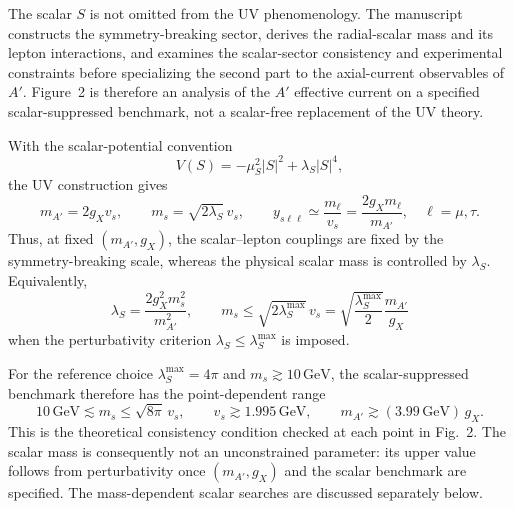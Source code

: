 \documentclass[12pt,a4paper]{article}
\begin{document}
The scalar \(S\) is not omitted from the UV phenomenology. The manuscript constructs the symmetry-breaking sector, derives the radial-scalar mass and its lepton interactions, and examines the scalar-sector consistency and experimental constraints before specializing the second part to the axial-current observables of \(A'\). Figure~2 is therefore an analysis of the \(A'\) effective current on a specified scalar-suppressed benchmark, not a scalar-free replacement of the UV theory.

With the scalar-potential convention
\[
V(S)=-\mu_S^2|S|^2+\lambda_S|S|^4,
\]
the UV construction gives
\[
m_{A'}=2g_Xv_s,\qquad
m_s=\sqrt{2\lambda_S}\,v_s,\qquad
y_{s\ell\ell}\simeq\frac{m_\ell}{v_s}
=\frac{2g_Xm_\ell}{m_{A'}},
\quad \ell=\mu,\tau.
\]
Thus, at fixed \((m_{A'},g_X)\), the scalar--lepton couplings are fixed by the symmetry-breaking scale, whereas the physical scalar mass is controlled by \(\lambda_S\). Equivalently,
\[
\lambda_S=\frac{2g_X^2m_s^2}{m_{A'}^2},
\qquad
m_s\leq\sqrt{2\lambda_S^{\max}}\,v_s
=\sqrt{\frac{\lambda_S^{\max}}{2}}\frac{m_{A'}}{g_X}
\]
when the perturbativity criterion \(\lambda_S\leq\lambda_S^{\max}\) is imposed.

For the reference choice \(\lambda_S^{\max}=4\pi\) and \(m_s\gtrsim10\,\mathrm{GeV}\), the scalar-suppressed benchmark therefore has the point-dependent range
\[
10\,\mathrm{GeV}\lesssim m_s\leq\sqrt{8\pi}\,v_s,
\qquad
v_s\gtrsim1.995\,\mathrm{GeV},
\qquad
m_{A'}\gtrsim(3.99\,\mathrm{GeV})\,g_X.
\]
This is the theoretical consistency condition checked at each point in Fig.~2. The scalar mass is consequently not an unconstrained parameter: its upper value follows from perturbativity once \((m_{A'},g_X)\) and the scalar benchmark are specified. The mass-dependent scalar searches are discussed separately below.
\end{document}
